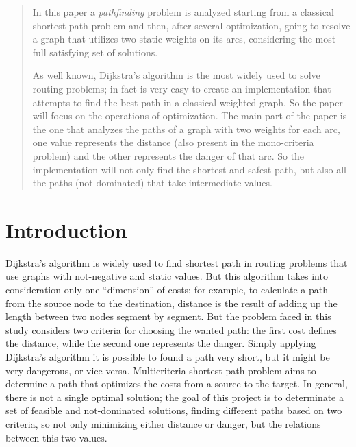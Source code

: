 \documentclass[a4paper,11pt]{report}
\begin{document}
\begin{abstract}
In this paper a \textit{pathfinding} problem is analyzed starting from a classical shortest path problem and then, after several optimization, going to resolve a graph that utilizes two static weights on its arcs, considering the most full satisfying set of solutions.

As well known, Dijkstra's algorithm is the most widely used to solve routing problems; in fact is very easy to create an implementation that attempts to find the best path in a classical weighted graph. So the paper will focus on the operations of optimization.
%
The main part of the paper is the one that analyzes the paths of a graph with two weights for each arc, one value represents the distance (also present in the mono-criteria problem) and the other represents the danger of that arc. So the implementation will not only find the shortest and safest path, but also all the paths (not dominated) that take intermediate values.
\end{abstract}

\tableofcontents

\chapter{Introduction}
Dijkstra's algorithm is widely used to find shortest path in routing problems that use graphs with not-negative and static values. But this algorithm takes into consideration only one ``dimension'' of costs; for example, to calculate a path from the source node to the destination, distance is the result of adding up the length between two nodes segment by segment.
%
But the problem faced in this study considers two criteria for choosing the wanted path: the first cost defines the distance, while the second one represents the danger. Simply applying Dijkstra's algorithm it is possible to found a path very short, but it might be very dangerous, or vice versa. Multicriteria shortest path problem aims to determine a path that optimizes the costs from a source to the target. In general, there is not a single optimal solution; the goal of this project is to determinate a set of feasible and not-dominated solutions, finding different paths based on two criteria, so not only minimizing either distance or danger, but the relations between this two values.
\vspace{5mm}
\end{document}
